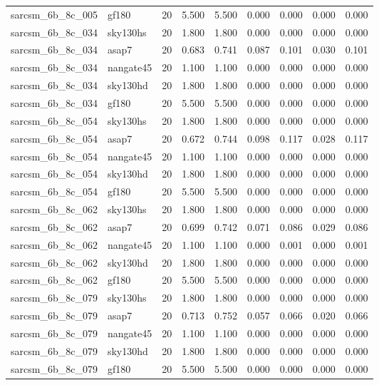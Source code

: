 \begin{tabular}{llrrrrrrr}
sarcsm\_6b\_8c\_005 & gf180 & 20 & 5.500 & 5.500 & 0.000 & 0.000 & 0.000 & 0.000 \\
sarcsm\_6b\_8c\_034 & sky130hs & 20 & 1.800 & 1.800 & 0.000 & 0.000 & 0.000 & 0.000 \\
sarcsm\_6b\_8c\_034 & asap7 & 20 & 0.683 & 0.741 & 0.087 & 0.101 & 0.030 & 0.101 \\
sarcsm\_6b\_8c\_034 & nangate45 & 20 & 1.100 & 1.100 & 0.000 & 0.000 & 0.000 & 0.000 \\
sarcsm\_6b\_8c\_034 & sky130hd & 20 & 1.800 & 1.800 & 0.000 & 0.000 & 0.000 & 0.000 \\
sarcsm\_6b\_8c\_034 & gf180 & 20 & 5.500 & 5.500 & 0.000 & 0.000 & 0.000 & 0.000 \\
sarcsm\_6b\_8c\_054 & sky130hs & 20 & 1.800 & 1.800 & 0.000 & 0.000 & 0.000 & 0.000 \\
sarcsm\_6b\_8c\_054 & asap7 & 20 & 0.672 & 0.744 & 0.098 & 0.117 & 0.028 & 0.117 \\
sarcsm\_6b\_8c\_054 & nangate45 & 20 & 1.100 & 1.100 & 0.000 & 0.000 & 0.000 & 0.000 \\
sarcsm\_6b\_8c\_054 & sky130hd & 20 & 1.800 & 1.800 & 0.000 & 0.000 & 0.000 & 0.000 \\
sarcsm\_6b\_8c\_054 & gf180 & 20 & 5.500 & 5.500 & 0.000 & 0.000 & 0.000 & 0.000 \\
sarcsm\_6b\_8c\_062 & sky130hs & 20 & 1.800 & 1.800 & 0.000 & 0.000 & 0.000 & 0.000 \\
sarcsm\_6b\_8c\_062 & asap7 & 20 & 0.699 & 0.742 & 0.071 & 0.086 & 0.029 & 0.086 \\
sarcsm\_6b\_8c\_062 & nangate45 & 20 & 1.100 & 1.100 & 0.000 & 0.001 & 0.000 & 0.001 \\
sarcsm\_6b\_8c\_062 & sky130hd & 20 & 1.800 & 1.800 & 0.000 & 0.000 & 0.000 & 0.000 \\
sarcsm\_6b\_8c\_062 & gf180 & 20 & 5.500 & 5.500 & 0.000 & 0.000 & 0.000 & 0.000 \\
sarcsm\_6b\_8c\_079 & sky130hs & 20 & 1.800 & 1.800 & 0.000 & 0.000 & 0.000 & 0.000 \\
sarcsm\_6b\_8c\_079 & asap7 & 20 & 0.713 & 0.752 & 0.057 & 0.066 & 0.020 & 0.066 \\
sarcsm\_6b\_8c\_079 & nangate45 & 20 & 1.100 & 1.100 & 0.000 & 0.000 & 0.000 & 0.000 \\
sarcsm\_6b\_8c\_079 & sky130hd & 20 & 1.800 & 1.800 & 0.000 & 0.000 & 0.000 & 0.000 \\
sarcsm\_6b\_8c\_079 & gf180 & 20 & 5.500 & 5.500 & 0.000 & 0.000 & 0.000 & 0.000 \\

\end{tabular}
